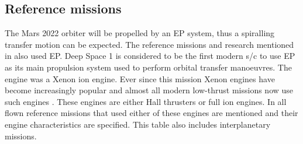 \subsection{Reference missions}
\label{subsec:refrestransorb}
The Mars 2022 orbiter will be propelled by an \ac{EP} system, thus a spiralling transfer motion can be expected. The reference missions and research mentioned in  also used \ac{EP}. Deep Space 1 is considered to be the first modern \ac{s/c} to use \ac{EP} as its main propulsion system used to perform orbital transfer manoeuvres. The engine was a Xenon ion engine. Ever since this mission Xenon engines have become increasingly popular and almost all modern low-thrust missions now use such engines \cite{wakker2010}. These engines are either Hall thrusters or full ion engines. In  all flown reference missions that used either of these engines are mentioned and their engine characteristics are specified. This table also includes interplanetary missions.

